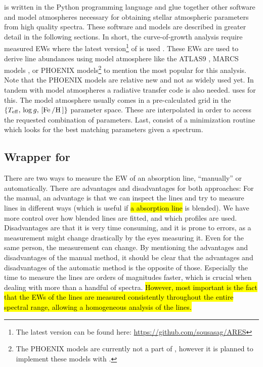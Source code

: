  is written in the Python programming language and glue together other software and
model atmospheres necessary for obtaining stellar atmospheric parameters from high quality spectra.
These software and models are described in greater detail in the following sections. In short, the
curve-of-growth analysis require measured EWs where the latest version\footnote{The latest version
can be found here: \url{https://github.com/sousasag/ARES}} of  is used
\citep{Sousa2015a}. These EWs are used to derive line abundances using model atmosphere like the
ATLAS9 \citep{Kurucz1993}, MARCS models \citep{Gustafson2008}, or PHOENIX models\footnote{The
PHOENIX models are currently not a part of , however it is planned to implement these
models with .} \citep{Husser2013} to mention the most popular for this analysis. Note that the
PHOENIX models are relative new and not as widely used yet. In tandem with model atmospheres a
radiative transfer code is also needed.  uses  \citep{Sneden1973} for this.
The model atmosphere usually comes in a pre-calculated grid in the $\{T_\mathrm{eff},\,\log
g,\,[\ion{Fe}/\ion{H}]\}$ parameter space. These are interpolated in order to access the requested
combination of parameters. Last,  consist of a minimization routine which looks for the
best matching parameters given a spectrum.



\subsection{Wrapper for }
\label{sec:measureEW}

There are two ways to measure the EW of an absorption line, ``manually'' or automatically. There are
advantages and disadvantages for both approaches: For the manual, an advantage is that we can
inspect the lines and try to measure lines in different ways (which is useful if \hl{a absorption
line} is blended). We have more control over how blended lines are fitted, and which profiles are
used. Disadvantages are that it is very time consuming, and it is prone to errors, as a measurement
might change drastically by the eyes measuring it. Even for the same person, the measurement can
change. By mentioning the advantages and disadvantages of the manual method, it should be clear that
the advantages and disadvantages of the automatic method is the opposite of those. Especially the
time to measure the lines are orders of magnitudes faster, which is crucial when dealing with more
than a handful of spectra. \hl{However, most important is the fact that the EWs of the lines are
measured consistently throughout the entire spectral range, allowing a homogeneous analysis of the
lines.}

